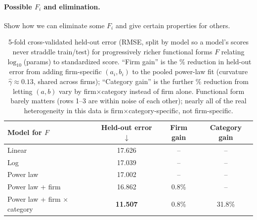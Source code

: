 \paragraph{Possible $F_i$ and elimination.} Show how we can eliminate some $F_i$ and give certain properties for others.
\begin{table}[t]
    \centering
    \begin{tabular}{lccc}
        \toprule
        Model for $F$
        & Held-out error $\downarrow$
        & Firm gain
        & Category gain \\
        \midrule
        Linear
        & 17.626 & -- & -- \\
        Log
        & 17.039 & -- & -- \\
        Power law
        & 17.002 & -- & -- \\
        Power law + firm
        & 16.862 & 0.8\% & -- \\
        Power law + firm $\times$ category
        & \textbf{11.507} & 0.8\% & 31.8\% \\
        \bottomrule
    \end{tabular}
    \caption{5-fold cross-validated held-out error (RMSE, split by model so a model's scores never straddle train/test) for progressively richer functional forms $F$ relating $\log_{10}$(params) to standardized score. ``Firm gain'' is the \% reduction in held-out error from adding firm-specific $(a_i,b_i)$ to the pooled power-law fit (curvature $\hat\gamma\approx0.13$, shared across firms); ``Category gain'' is the further \% reduction from letting $(a,b)$ vary by firm$\times$category instead of firm alone. Functional form barely matters (rows 1--3 are within noise of each other); nearly all of the real heterogeneity in this data is firm$\times$category-specific, not firm-specific.}
    \label{tab:scaling_function_fits}
\end{table}

